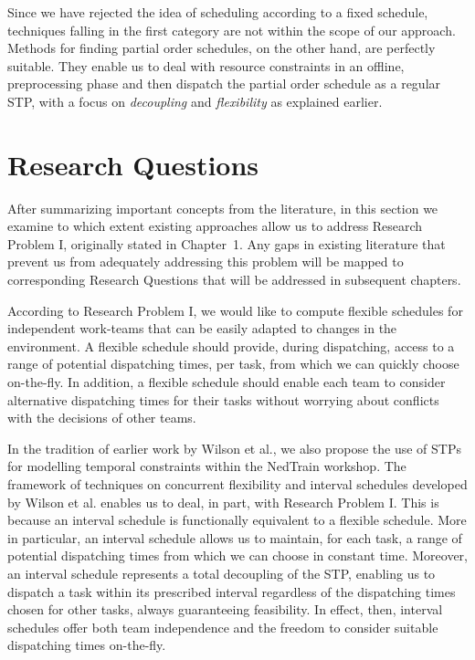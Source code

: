 	Since we have rejected the idea of scheduling according to a fixed schedule,
	techniques falling in the first category are not within the scope of our approach.
	Methods for finding partial order schedules, on the other hand, are perfectly suitable.
	They enable us to deal with resource constraints in an offline, preprocessing phase
	and then dispatch the partial order schedule as a regular STP,
	with a focus on \emph{decoupling} and \emph{flexibility} as explained earlier.

\section{Research Questions}
\label{chapter:prelim-1:research-questions}
	After summarizing important concepts from the literature,
	in this section we examine to which extent existing approaches allow us to address Research Problem I, originally stated in Chapter~1.
	Any gaps in existing literature that prevent us from adequately addressing this problem will be mapped to 
	corresponding Research Questions that will be addressed in subsequent chapters.

	According to Research Problem I, 
	we would like to compute flexible schedules for independent work-teams that can be easily adapted to changes in the environment.
	A flexible schedule should provide, during dispatching,
	access to a range of potential dispatching times, per task, from which we can quickly choose on-the-fly.
	In addition, a flexible schedule should enable each team to consider alternative dispatching times 
	for their tasks without worrying about conflicts with the decisions of other teams.

	In the tradition of earlier work by Wilson et al., 
	we also propose the use of STPs for modelling temporal constraints within the NedTrain workshop.
	The framework of techniques on concurrent flexibility and interval schedules developed by Wilson et al. 
	enables us to deal, in part, with Research Problem I.
	This is because an interval schedule is functionally equivalent to a flexible schedule.
	More in particular, an interval schedule allows us to maintain, for each task, 
	a range of potential dispatching times from which we can choose in constant time.
	Moreover, an interval schedule represents a total decoupling of the STP, 
	enabling us to dispatch a task within its prescribed interval regardless of the 
	dispatching times chosen for other tasks, always guaranteeing feasibility.
	In effect, then, 
	interval schedules offer both team independence and the freedom to consider suitable dispatching times on-the-fly.

